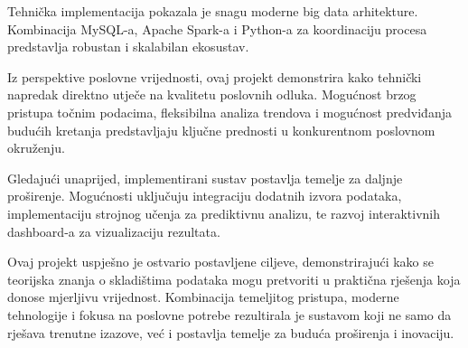 Tehnička implementacija pokazala je snagu moderne big data arhitekture. Kombinacija MySQL-a, Apache Spark-a i Python-a za koordinaciju procesa predstavlja robustan i skalabilan ekosustav.

Iz perspektive poslovne vrijednosti, ovaj projekt demonstrira kako tehnički napredak direktno utječe na kvalitetu poslovnih odluka. Mogućnost brzog pristupa točnim podacima, fleksibilna analiza trendova i mogućnost predviđanja budućih kretanja predstavljaju ključne prednosti u konkurentnom poslovnom okruženju.

Gledajući unaprijed, implementirani sustav postavlja temelje za daljnje proširenje. Mogućnosti uključuju integraciju dodatnih izvora podataka, implementaciju strojnog učenja za prediktivnu analizu, te razvoj interaktivnih dashboard-a za vizualizaciju rezultata.

Ovaj projekt uspješno je ostvario postavljene ciljeve, demonstrirajući kako se teorijska znanja o skladištima podataka mogu pretvoriti u praktična rješenja koja donose mjerljivu vrijednost. Kombinacija temeljitog pristupa, moderne tehnologije i fokusa na poslovne potrebe rezultirala je sustavom koji ne samo da rješava trenutne izazove, već i postavlja temelje za buduća proširenja i inovaciju.
